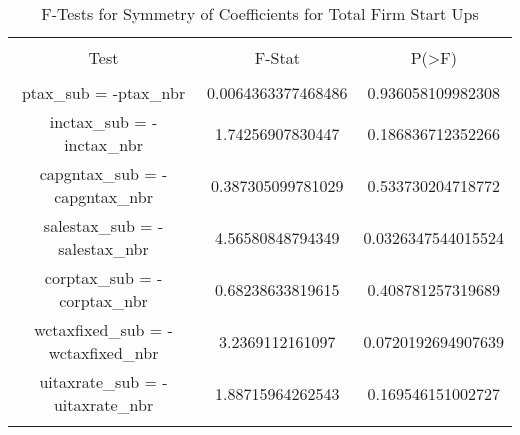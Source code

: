 
\begin{table}[!htbp] \centering 
  \caption{F-Tests for Symmetry of Coefficients for Total Firm Start Ups} 
  \label{} 
\begin{tabular}{@{\extracolsep{5pt}} ccc} 
\\[-1.8ex]\hline 
\hline \\[-1.8ex] 
Test & F-Stat & P(\textgreater F) \\ 
\hline \\[-1.8ex] 
ptax\_sub = -ptax\_nbr & 0.0064363377468486 & 0.936058109982308 \\ 
inctax\_sub = -inctax\_nbr & 1.74256907830447 & 0.186836712352266 \\ 
capgntax\_sub = -capgntax\_nbr & 0.387305099781029 & 0.533730204718772 \\ 
salestax\_sub = -salestax\_nbr & 4.56580848794349 & 0.0326347544015524 \\ 
corptax\_sub = -corptax\_nbr & 0.68238633819615 & 0.408781257319689 \\ 
wctaxfixed\_sub = -wctaxfixed\_nbr & 3.2369112161097 & 0.0720192694907639 \\ 
uitaxrate\_sub = -uitaxrate\_nbr & 1.88715964262543 & 0.169546151002727 \\ 
\hline \\[-1.8ex] 
\end{tabular} 
\end{table} 
